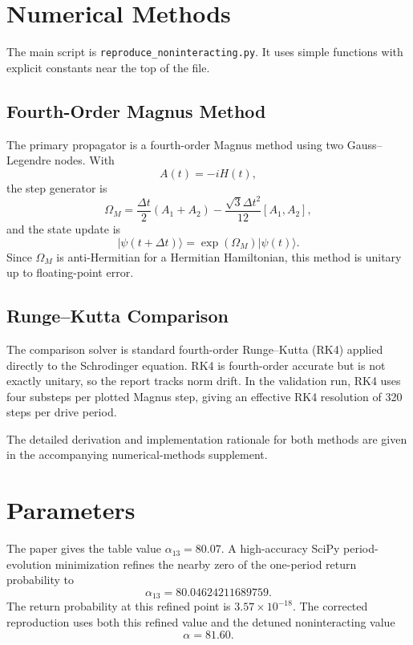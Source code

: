 \documentclass[11pt,a4paper]{article}
\begin{document}
\section{Numerical Methods}

The main script is \texttt{reproduce\_noninteracting.py}. It uses simple functions with explicit constants near the top of the file.

\subsection{Fourth-Order Magnus Method}

The primary propagator is a fourth-order Magnus method using two Gauss--Legendre nodes. With
\begin{equation}
A(t)=-iH(t),
\end{equation}
the step generator is
\begin{equation}
\Omega_M
= \frac{\Delta t}{2}(A_1+A_2)
 - \frac{\sqrt{3}\Delta t^2}{12}[A_1,A_2],
\end{equation}
and the state update is
\begin{equation}
|\psi(t+\Delta t)\rangle=\exp(\Omega_M)|\psi(t)\rangle.
\end{equation}
Since \(\Omega_M\) is anti-Hermitian for a Hermitian Hamiltonian, this method is unitary up to floating-point error.

\subsection{Runge--Kutta Comparison}

The comparison solver is standard fourth-order Runge--Kutta (RK4) applied directly to the Schrodinger equation. RK4 is fourth-order accurate but is not exactly unitary, so the report tracks norm drift. In the validation run, RK4 uses four substeps per plotted Magnus step, giving an effective RK4 resolution of 320 steps per drive period.

The detailed derivation and implementation rationale for both methods are given in the accompanying numerical-methods supplement.

\section{Parameters}

The paper gives the table value \(\alpha_{13}=80.07\). A high-accuracy SciPy period-evolution minimization refines the nearby zero of the one-period return probability to
\begin{equation}
\alpha_{13}=80.04624211689759.
\end{equation}
The return probability at this refined point is \(3.57\times10^{-18}\). The corrected reproduction uses both this refined value and the detuned noninteracting value
\begin{equation}
\alpha=81.60.
\end{equation}
\end{document}

